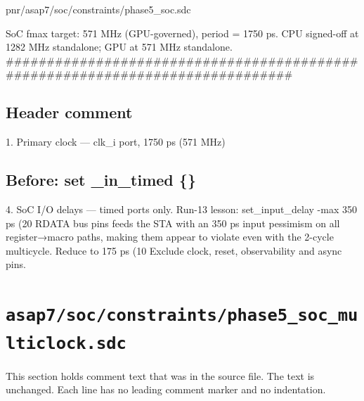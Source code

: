 \begin{relocated}{pnr/asap7/soc/constraints/phase5_soc.sdc}
\begin{textblock}
SoC fmax target: 571 MHz (GPU-governed), period = 1750 ps.
CPU signed-off at 1282 MHz standalone; GPU at 571 MHz standalone.
##############################################################################
\end{textblock}

\subsection*{Header comment}

\begin{textblock}
1. Primary clock — clk_i port, 1750 ps (571 MHz)
\end{textblock}

\subsection*{Before: set \_in\_timed \{\}}

\begin{textblock}
4. SoC I/O delays — timed ports only.
   Run-13 lesson: set_input_delay -max 350 ps (20%
   RDATA bus pins feeds the STA with an 350 ps input pessimism on all
   register→macro paths, making them appear to violate even with the 2-cycle
   multicycle.  Reduce to 175 ps (10%
   Exclude clock, reset, observability and async pins.
\end{textblock}

\end{relocated}

\section{\texttt{asap7/soc/constraints/phase5\_soc\_multiclock.sdc}}\label{tm:pd:asap7-soc-phase5-multiclock-sdc}

This section holds comment text that was in the source file. The text is unchanged. Each line has no leading comment marker and no indentation.

